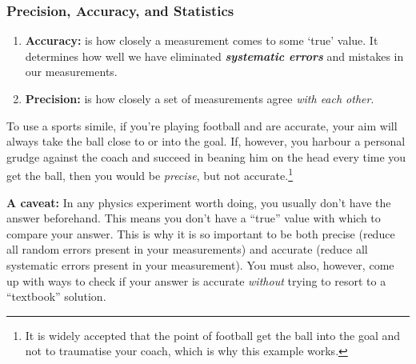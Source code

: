 

\subsubsection{Precision, Accuracy, and Statistics}

\begin{enumerate}
    \item \textbf{Accuracy:} is how closely a measurement comes to some `true' value. It determines how well we have eliminated \textbf{\textit{systematic errors}} and mistakes in our measurements.
    \item \textbf{Precision:} is how closely a set of measurements agree \textit{with each other}. %
\end{enumerate}

To use a sports simile, if you're playing football and are accurate, your aim will always take the ball close to or into the goal. If, however, you harbour a personal grudge against the coach and succeed in beaning him on the head every time you get the ball, then you would be \textit{precise}, but not accurate.\footnote{It is widely accepted that the point of football get the ball into the goal and not to traumatise your coach, which is why this example works.}

\textbf{A caveat:} In any physics experiment worth doing, you usually don't have the answer beforehand. This means you don't have a ``true'' value with which to compare your answer. This is why it is so important to be both precise (reduce all random errors present in your measurements) and accurate (reduce all systematic errors present in your measurement). You must also, however, come up with ways to check if your answer is accurate \textit{without} trying to resort to a ``textbook'' solution.

